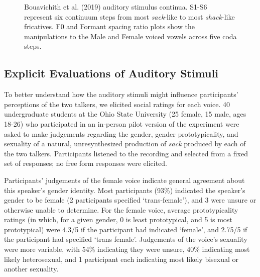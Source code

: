 \documentclass[
  letterpaper,
  DIV=11,
  numbers=noendperiod]{scrartcl}
\begin{document}
\begin{figure}


\caption{\label{fig-stimuli}Bouavichith et al. (2019) auditory stimulus
continua. S1-S6 represent six continuum steps from most \emph{sack}-like
to most \emph{shack}-like fricatives. F0 and Formant spacing ratio plots
show the manipulations to the Male and Female voiced vowels across five
coda steps.}

\end{figure}%

\subsection{Explicit Evaluations of Auditory
Stimuli}\label{sec-stim-evals}

To better understand how the auditory stimuli might influence
participants' perceptions of the two talkers, we elicited social ratings
for each voice. 40 undergraduate students at the Ohio State University
(25 female, 15 male, ages 18-26) who participated in an in-person pilot
version of the experiment were asked to make judgements regarding the
gender, gender prototypicality, and sexuality of a natural,
unresynthesized production of \emph{sack} produced by each of the two
talkers. Participants listened to the recording and selected from a
fixed set of responses; no free form responses were elicited.

Participants' judgements of the female voice indicate general agreement
about this speaker's gender identity. Most participants (93\%) indicated
the speaker's gender to be female (2 participants specified
`trans-female'), and 3 were unsure or otherwise unable to determine. For
the female voice, average prototypicality ratings (in which, for a given
gender, 0 is least prototypical, and 5 is most prototypical) were 4.3/5
if the participant had indicated `female', and 2.75/5 if the participant
had specified `trans female'. Judgements of the voice's sexuality were
more variable, with 54\% indicating they were unsure, 40\% indicating
most likely heterosexual, and 1 participant each indicating most likely
bisexual or another sexuality.
\end{document}
